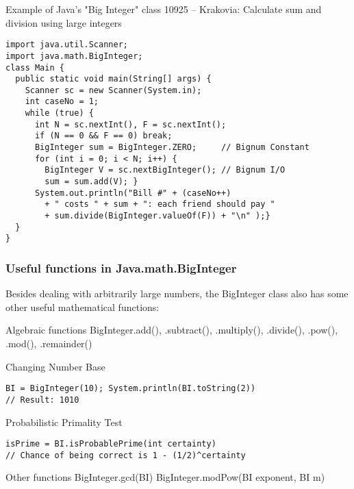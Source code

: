 \begin{frame}[fragile]{Example of Java's "Big Integer" class}
  {10925 -- Krakovia: Calculate sum and division using large integers}

  {\smaller
\begin{block}{}
\begin{verbatim}
import java.util.Scanner;
import java.math.BigInteger;
class Main {
  public static void main(String[] args) {
    Scanner sc = new Scanner(System.in);
    int caseNo = 1;
    while (true) {
      int N = sc.nextInt(), F = sc.nextInt();
      if (N == 0 && F == 0) break;
      BigInteger sum = BigInteger.ZERO;     // Bignum Constant
      for (int i = 0; i < N; i++) {
        BigInteger V = sc.nextBigInteger(); // Bignum I/O
        sum = sum.add(V); }
      System.out.println("Bill #" + (caseNo++)
        + " costs " + sum + ": each friend should pay "
        + sum.divide(BigInteger.valueOf(F)) + "\n" );}
  }
}
\end{verbatim}
  \end{block}}
\end{frame}


\begin{frame}[fragile]
  \frametitle{Useful functions in Java.math.BigInteger}
  Besides dealing with arbitrarily large numbers, the BigInteger class also has some other useful mathematical functions:

{\smaller
  \begin{block}{Algebraic functions}
    BigInteger.add(), .subtract(), .multiply(), .divide(),
    .pow(), .mod(), .remainder()
  \end{block}

  \begin{block}{Changing Number Base}
\begin{verbatim}
BI = BigInteger(10); System.println(BI.toString(2))
// Result: 1010
\end{verbatim}
  \end{block}

  \begin{block}{Probabilistic Primality Test}
\begin{verbatim}
isPrime = BI.isProbablePrime(int certainty)
// Chance of being correct is 1 - (1/2)^certainty
\end{verbatim}
  \end{block}


\begin{block}{Other functions}
  BigInteger.gcd(BI)
  BigInteger.modPow(BI exponent, BI m)
\end{block}}
\end{frame}

